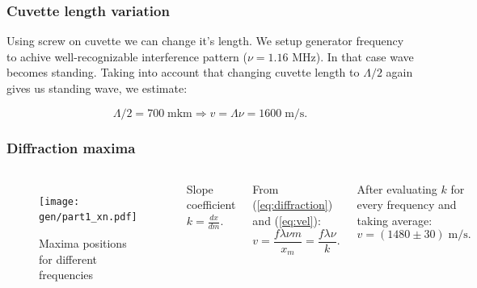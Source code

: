 \documentclass{beamer}
\begin{document}
	\begin{frame}
		\frametitle{Cuvette length variation}

		Using screw on cuvette we can change it's length. We setup generator frequency to achive well-recognizable interference pattern ($\nu = 1.16$ MHz). In that case wave becomes standing. Taking into account that changing cuvette length to $\Lambda / 2$ again gives us standing wave, we estimate: 
		
		$$ \Lambda / 2 = 700 \; \text{mkm} \Rightarrow v = \Lambda \nu = 1600 \;\text{m/s}.$$
		
	\end{frame}


	\begin{frame}
		\frametitle{Diffraction maxima}
		\begin{columns}
			\begin{figure}
				\centering
				\texttt{[image: gen/part1\_xn.pdf]}
				\caption{Maxima positions for different frequencies}
				\label{fig:part1_xn}
			\end{figure}
			Slope coefficient $k = \frac{dx}{dm}$.
			
			From (\ref{eq:diffraction}) and (\ref{eq:vel}):
			$$ v = \frac{f \lambda \nu m}{x_m} = \frac{f \lambda \nu}{k}.$$
			
			After evaluating $k$ for every frequency and taking average:
			$$ v = (1480 \pm 30)\; \text{m/s}.$$
			
		\end{columns}
				
	\end{frame}
\end{document}
